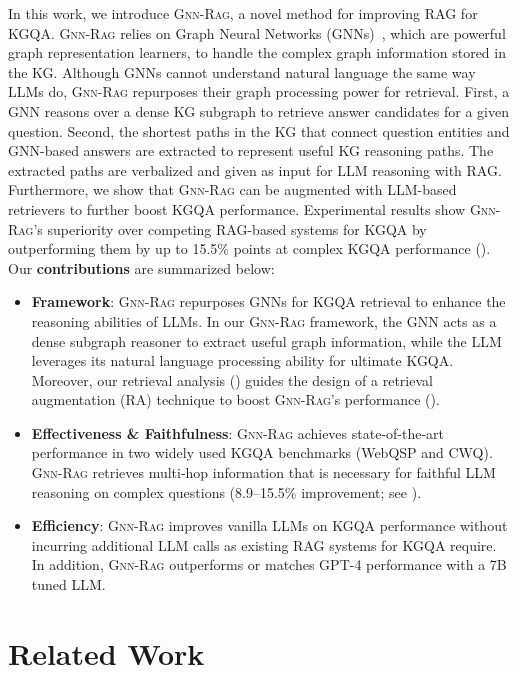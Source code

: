 \documentclass{article}
\newcommand{\grag}{\textsc{Gnn-Rag}\xspace}
\newcommand{\gragx}{\textsc{Gnn-Rag}}
\theoremstyle{plain}
\theoremstyle{definition}
\theoremstyle{remark}
\begin{document}
In this work, we introduce \grag, a novel method for improving RAG for KGQA. \grag relies on Graph Neural Networks (GNNs)~\citep{mavromatis2022rearev}, which  are powerful graph representation learners, to handle the complex graph information stored in the KG. Although GNNs cannot understand natural language the same way LLMs do, \grag repurposes their graph processing power for retrieval.  First, a GNN reasons over a dense KG subgraph to retrieve answer candidates for a given question. Second, the shortest paths in the KG  that connect question entities and GNN-based answers are extracted to represent useful KG reasoning paths. The extracted paths are verbalized and given as input for LLM reasoning with RAG. 
Furthermore, we show that \grag can be augmented with LLM-based retrievers to further boost KGQA performance.
Experimental results show \grag's superiority over competing RAG-based systems for KGQA by outperforming them by up to 15.5\% points at complex KGQA performance (). 
Our \textbf{contributions} are summarized below:
\begin{itemize}
    \item \textbf{Framework}: \grag repurposes GNNs for KGQA retrieval to enhance the reasoning abilities of LLMs. In our \textsc{Gnn-Rag} framework, the GNN acts as a dense subgraph reasoner to extract useful graph information, while the LLM leverages its natural language processing ability for ultimate KGQA.  Moreover, our retrieval analysis () guides the design of a retrieval augmentation (RA) technique to boost \gragx's performance (). 
    \item \textbf{Effectiveness \& Faithfulness}: \grag achieves state-of-the-art performance in two widely
used KGQA benchmarks (WebQSP and CWQ). \grag retrieves multi-hop information that is necessary for faithful LLM reasoning on complex questions (8.9--15.5\% improvement; see ).
    \item \textbf{Efficiency}: \grag improves vanilla LLMs on KGQA performance without incurring additional LLM calls as existing RAG systems for KGQA require. In addition, \grag outperforms or matches GPT-4 performance with a 7B tuned LLM.
\end{itemize}


\section{Related Work}
\end{document}
